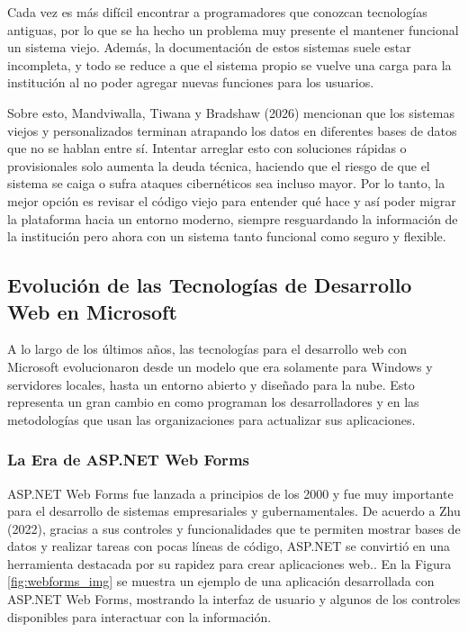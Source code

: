 Cada vez es más difícil encontrar a programadores que conozcan tecnologías antiguas, por lo que se ha hecho un problema muy presente el mantener funcional un sistema viejo. Además, la documentación de estos sistemas suele estar incompleta, y todo se reduce a que el sistema propio se vuelve una carga para la institución al no poder agregar nuevas funciones para los usuarios.

Sobre esto, Mandviwalla, Tiwana y Bradshaw (2026) mencionan que los sistemas viejos y personalizados terminan atrapando los datos en diferentes bases de datos que no se hablan entre sí. Intentar arreglar esto con soluciones rápidas o provisionales solo aumenta la deuda técnica, haciendo que el riesgo de que el sistema se caiga o sufra ataques cibernéticos sea incluso mayor.\cite{mandviwalla2025modernizing} Por lo tanto, la mejor opción es revisar el código viejo para entender qué hace y así poder migrar la plataforma hacia un entorno moderno, siempre resguardando la información de la institución pero ahora con un sistema tanto funcional como seguro y flexible.

\subsection{Evolución de las Tecnologías de Desarrollo Web en Microsoft}
\label{sec:evolucion_tecnologias}
A lo largo de los últimos años, las tecnologías para el desarrollo web con Microsoft evolucionaron  desde  un modelo que era solamente para Windows y servidores locales, hasta un entorno abierto y diseñado para la nube. Esto representa un gran cambio en como programan los desarrolladores y en las metodologías que usan las organizaciones para actualizar sus aplicaciones.

\subsubsection{La Era de ASP.NET Web Forms}
\label{sec:aspnet_webforms}
ASP.NET Web Forms fue lanzada a principios de los 2000 y fue muy importante para el desarrollo de sistemas empresariales y gubernamentales. De acuerdo a Zhu (2022), gracias a sus controles y funcionalidades que te permiten mostrar bases de datos y realizar tareas con pocas líneas de código, ASP.NET se convirtió en una herramienta destacada por su rapidez para crear aplicaciones web.\cite{zhu2022diseno}. En la Figura \ref{fig:webforms_img} se muestra un ejemplo de una aplicación desarrollada con ASP.NET Web Forms, mostrando la interfaz de usuario y algunos de los controles disponibles para interactuar con la información.\cite{microsoft2022aspnetwebforms}

